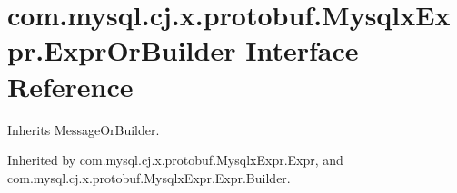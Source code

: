 \hypertarget{interfacecom_1_1mysql_1_1cj_1_1x_1_1protobuf_1_1_mysqlx_expr_1_1_expr_or_builder}{}\section{com.\+mysql.\+cj.\+x.\+protobuf.\+Mysqlx\+Expr.\+Expr\+Or\+Builder Interface Reference}
\label{interfacecom_1_1mysql_1_1cj_1_1x_1_1protobuf_1_1_mysqlx_expr_1_1_expr_or_builder}


Inherits Message\+Or\+Builder.



Inherited by com.\+mysql.\+cj.\+x.\+protobuf.\+Mysqlx\+Expr.\+Expr, and com.\+mysql.\+cj.\+x.\+protobuf.\+Mysqlx\+Expr.\+Expr.\+Builder.

